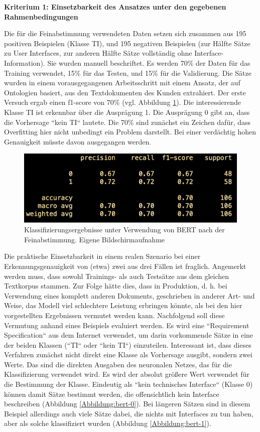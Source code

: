 {\bf Kriterium 1: Einsetzbarkeit des Ansatzes unter den gegebenen Rahmenbedingungen}

Die für die Feinabstimmung verwendeten Daten setzen sich zusammen aus 195 positiven Beispielen (Klasse TI), und 195 negativen Beispielen (zur Hälfte Sätze zu User Interfaces, zur anderen Hälfte Sätze vollständig ohne Interface-Information). Sie wurden manuell beschriftet. Es werden 70\% der Daten für das Training verwendet, 15\% für das Testen, und 15\% für die Validierung. Die Sätze wurden in einem vorausgegangenen Arbeitsschritt mit einem Ansatz, der auf Ontologien basiert, aus den Textdokumenten des Kunden extrahiert. Der erste Versuch ergab einen f1-score von 70\% (vgl. Abbildung \ref{Abbildung:bert-confusion}). Die interessierende Klasse TI ist erkennbar über die Ausprägung 1. Die Ausprägung 0 gibt an, dass die Vorhersage ``kein TI`` lautete. Die 70\% sind zunächst ein Zeichen dafür, dass Overfitting hier nicht unbedingt ein Problem darstellt. Bei einer verdächtig hohen Genauigkeit müsste davon ausgegangen werden.
 
\begin{figure}[h]
\centering
\includegraphics[scale=0.95]{content/pics/Picture_23.png}
\caption{Klassifizierungsergebnisse unter Verwendung von BERT nach der Feinabstimmung. Eigene Bildschirmaufnahme}
\label{Abbildung:bert-confusion}
\end{figure}

Die praktische Einsetzbarkeit in einem realen Szenario bei einer Erkennungsgenauigkeit von (etwa) zwei aus drei Fällen ist fraglich. Angemerkt werden muss, dass sowohl Trainings- als auch Testsätze aus dem gleichen Textkorpus stammen. Zur Folge hätte dies, dass in Produktion, d. h. bei Verwendung eines komplett anderen Dokuments, geschrieben in anderer Art- und Weise, das Modell viel schlechtere Leistung erbringen könnte, als bei den hier vorgestellten Ergebnissen vermutet werden kann. Nachfolgend soll diese Vermutung anhand eines Beispiels evaluiert werden. Es wird eine ``Requirement Specification`` aus dem Internet verwendet, um darin vorkommende Sätze in eine der beiden Klassen (``TI`` oder ``kein TI``) einzuteilen. Interessant ist, dass dieses Verfahren zunächst nicht direkt eine Klasse als Vorhersage ausgibt, sondern zwei Werte. Das sind die direkten Ausgaben des neuronalen Netzes, das für die Klassifizierung verwendet wird. Es wird der absolut größere Wert verwendet für die Bestimmung der Klasse. Eindeutig als ``kein technisches Interface`` (Klasse 0) können damit Sätze bestimmt werden, die offensichtlich kein Interface beschreiben (Abbildung \ref{Abbildung:bert-0}). Bei längeren Sätzen sind in diesem Beispiel allerdings auch viele Sätze dabei, die nichts mit Interfaces zu tun haben, aber als solche klassifiziert wurden (Abbildung \ref{Abbildung:bert-1}).

